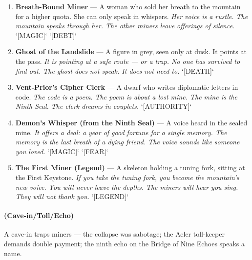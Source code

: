 \begin{enumerate}
  \hfill \textit{The prince is the one who stole the Kalrantha amulet. The hunter has a map tattooed on his back. The map moves.} `[GREED]`
\item \textbf{Breath-Bound Miner} --- A woman who sold her breath to the mountain for a higher quota. She can only speak in whispers.
  \hfill \textit{Her voice is a rustle. The mountain speaks through her. The other miners leave offerings of silence.} `[MAGIC]` `[DEBT]`
\item[J] \textbf{Ghost of the Landslide} --- A figure in grey, seen only at dusk. It points at the pass.
  \hfill \textit{It is pointing at a safe route — or a trap. No one has survived to find out. The ghost does not speak. It does not need to.} `[DEATH]`
\item[Q] \textbf{Vent-Prior's Cipher Clerk} --- A dwarf who writes diplomatic letters in code.
  \hfill \textit{The code is a poem. The poem is about a lost mine. The mine is the Ninth Seal. The clerk dreams in couplets.} `[AUTHORITY]`
\item[K] \textbf{Demon's Whisper (from the Ninth Seal)} --- A voice heard in the sealed mine.
  \hfill \textit{It offers a deal: a year of good fortune for a single memory. The memory is the last breath of a dying friend. The voice sounds like someone you loved.} `[MAGIC]` `[FEAR]`
\item[A] \textbf{The First Miner (Legend)} --- A skeleton holding a tuning fork, sitting at the First Keystone.
  \hfill \textit{If you take the tuning fork, you become the mountain's new voice. You will never leave the depths. The miners will hear you sing. They will not thank you.} `[LEGEND]`
\end{enumerate}

\paragraph*{(Cave-in/Toll/Echo)} A cave-in traps miners — the collapse was sabotage; the Aeler toll-keeper demands double payment; the ninth echo on the Bridge of Nine Echoes speaks a name.

